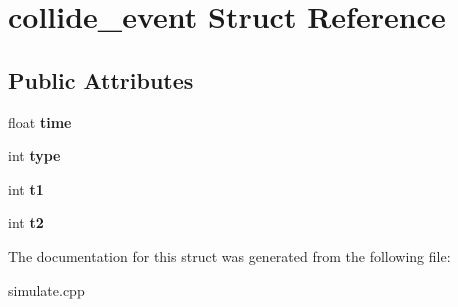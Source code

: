 \hypertarget{structcollide__event}{\section{collide\-\_\-event Struct Reference}
\label{structcollide__event}
}
\subsection*{Public Attributes}
\begin{DoxyCompactItemize}
\item 
\hypertarget{structcollide__event_acf94b262e702e090fb9b7deea3f81267}{float {\bfseries time}}\label{structcollide__event_acf94b262e702e090fb9b7deea3f81267}

\item 
\hypertarget{structcollide__event_a62c3ceb5b04061647ecdd123b0c5be8b}{int {\bfseries type}}\label{structcollide__event_a62c3ceb5b04061647ecdd123b0c5be8b}

\item 
\hypertarget{structcollide__event_a54c3a2edee7604746815f795c9eed61e}{int {\bfseries t1}}\label{structcollide__event_a54c3a2edee7604746815f795c9eed61e}

\item 
\hypertarget{structcollide__event_ab871578e8f2ec7953bfbb32ecf27e650}{int {\bfseries t2}}\label{structcollide__event_ab871578e8f2ec7953bfbb32ecf27e650}

\end{DoxyCompactItemize}


The documentation for this struct was generated from the following file\-:\begin{DoxyCompactItemize}
\item 
simulate.\-cpp\end{DoxyCompactItemize}
